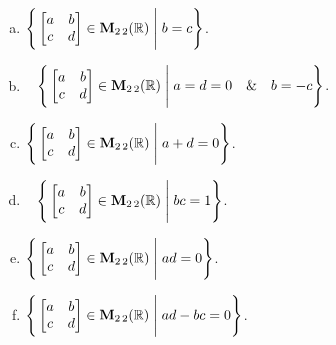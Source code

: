 \begin{prob}
\begin{enumerate}[a)]
\item  $\Bigg\{  \bmatrix a&b\\ c&d\endbmatrix \in \M_{2 \,2}(\R) \;\Bigg|\; b=c\Bigg\}$.\medskip \medskip


\item\sov~ $\Bigg\{  \bmatrix a&b\\ c&d\endbmatrix \in \M_{2 \,2}(\R) \;\Bigg|\;a=d=0\quad \&\quad b=-c  \Bigg\}$.\medskip \medskip


\item  $\Bigg\{  \bmatrix a&b\\ c&d\endbmatrix \in \M_{2 \,2}(\R) \;\Bigg|\; a+d=0\Bigg\}$. \medskip

\item\sov~ $\Bigg\{  \bmatrix a&b\\ c&d\endbmatrix \in \M_{2 \,2}(\R) \;\Bigg|\; bc=1\Bigg\}$.      \medskip

\item  $\Bigg\{  \bmatrix a&b\\ c&d\endbmatrix \in \M_{2 \,2}(\R) \;\Bigg|\; ad=0\Bigg\}$.      \medskip

\item  $\Bigg\{  \bmatrix a&b\\ c&d\endbmatrix \in \M_{2 \,2}(\R) \;\Bigg|\; ad-bc=0\Bigg\}$. \medskip







\end{enumerate}

\end{prob}
